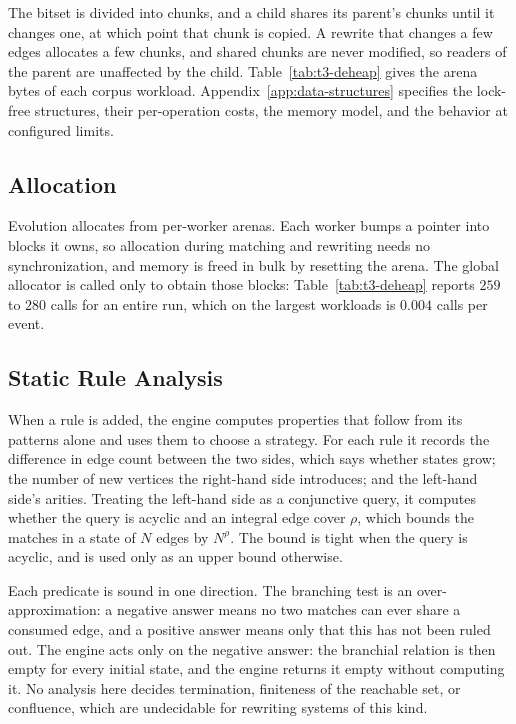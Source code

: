 The bitset is divided into chunks, and a child shares its parent's chunks until it changes one, at
which point that chunk is copied. A rewrite that changes a few edges allocates a few chunks, and
shared chunks are never modified, so readers of the parent are unaffected by the child.
Table~\ref{tab:t3-deheap} gives the arena bytes of each corpus workload. Appendix~\ref{app:data-structures}
specifies the lock-free structures, their per-operation costs, the memory model, and the behavior
at configured limits.

\subsection{Allocation}
\label{sec:allocation}

Evolution allocates from per-worker arenas. Each worker bumps a pointer into blocks it owns, so
allocation during matching and rewriting needs no synchronization, and memory is freed in bulk by
resetting the arena. The global allocator is called only to obtain those blocks:
Table~\ref{tab:t3-deheap} reports $259$ to $280$ calls for an entire run, which on the largest
workloads is $0.004$ calls per event.

\subsection{Static Rule Analysis}
\label{sec:static-analysis}
\label{sec:rule-analysis}

When a rule is added, the engine computes properties that follow from its patterns alone and uses
them to choose a strategy. For each rule it records the difference in edge count between the two
sides, which says whether states grow; the number of new vertices the right-hand side introduces;
and the left-hand side's arities. Treating the left-hand side as a conjunctive query, it computes
whether the query is acyclic and an integral edge cover $\rho$, which bounds the matches in a state
of $N$ edges by $N^{\rho}$. The bound is tight when the query is acyclic, and is used only as an
upper bound otherwise.

Each predicate is sound in one direction. The branching test is an over-approximation: a negative
answer means no two matches can ever share a consumed edge, and a positive answer means only that
this has not been ruled out. The engine acts only on the negative answer: the branchial relation
is then empty for every initial state, and the engine returns it empty without computing it. No
analysis here decides termination, finiteness of the reachable set, or confluence, which are
undecidable for rewriting systems of this kind.

